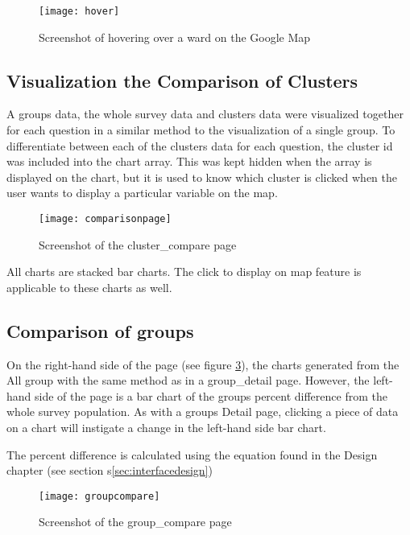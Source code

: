 \begin{figure}[h]
\centering
\texttt{[image: hover]}
\caption{Screenshot of hovering over a ward on the Google Map}
\label{fig:hover}
\end{figure}

\subsection{Visualization the Comparison of Clusters}
A group\textquotesingle s data, the whole survey data and clusters\textsc{} data were visualized together for each question in a similar method to the visualization of a single group. To differentiate between each of the clusters\textsc{} data for each question, the cluster id was included into the chart array. This was kept hidden when the array is displayed on the chart, but it is used to know which cluster is clicked when the user wants to display a particular variable on the map.   

\begin{figure}[h]
\centering
\texttt{[image: comparisonpage]}
\caption{Screenshot of the cluster\_compare page}
\label{fig:comparisonpage}
\end{figure}

All charts are stacked bar charts. The click to display on map feature is applicable to these charts as well.

\subsection{Comparison of groups}
On the right-hand side of the page (see figure \ref{fig:groupcompare}), the charts generated from the All group with the same method as in a group\_detail page. However, the left-hand side of the page is a bar chart of the group\textquotesingle s percent difference from the whole survey population. As with a group\textquotesingle s Detail page, clicking a piece of data on a chart will instigate a change in the left-hand side bar chart.\par

The percent difference is calculated using the equation found in the Design chapter (see section s\ref{sec:interfacedesign})

\begin{figure}[h]
\centering
\texttt{[image: groupcompare]}
\caption{Screenshot of the group\_compare page}
\label{fig:groupcompare}
\end{figure}

